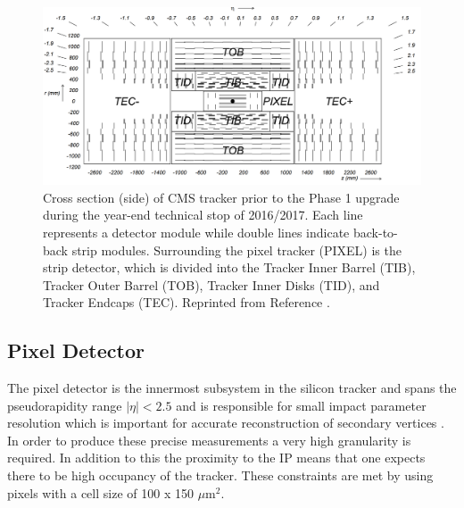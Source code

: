 \begin{figure}[h]
	\centering
	\includegraphics[width=1.0\linewidth]{Figures/TrackerLayout_v2}
	\caption{Cross section (side) of CMS tracker prior to the Phase 1 upgrade during the year-end technical stop of 2016/2017. Each line represents a detector module while double lines indicate back-to-back strip modules. Surrounding the pixel tracker (PIXEL) is the strip detector, which is divided into the Tracker Inner Barrel (TIB), Tracker Outer Barrel (TOB), Tracker Inner Disks (TID), and Tracker Endcaps (TEC). Reprinted from Reference \cite{Chatrchyan:1704291}.}
	\label{fig:trackerlayoutv2}
\end{figure}

\subsection{Pixel Detector}
The pixel detector is the innermost subsystem in the silicon tracker and spans the pseudorapidity range $|\eta|< 2.5$ and is responsible for small impact parameter resolution which is important for accurate reconstruction of secondary vertices \cite{Collaboration_2008}.  In order to produce these precise measurements a very high granularity is required.  In addition to this the proximity to the IP means that one expects there to be high occupancy of the tracker.  These constraints are met by using pixels with a cell size of 100 x 150 $\mu$m$^{2}$.  

